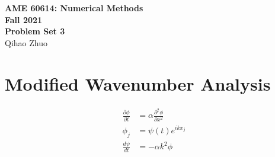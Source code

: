 \documentclass[letterpaper,10pt]{article}
\begin{document}
\fancyhf{}
\fancyfoot[C]{\thepage}

\thispagestyle{plain}
\begin{center}
  \large
  \textbf{AME 60614: Numerical Methods} \\
  \textbf{Fall 2021} \\
  \vspace{0.5em}
  \textbf{Problem Set 3} \\
  \vspace{1em}
  Qihao Zhuo
\end{center}

\vspace{1.5em}

\section{Modified Wavenumber Analysis}\label{sec1}
\begin{align*}
  \frac{\partial \phi}{\partial t}&=\alpha \frac{\partial^2 \phi}{\partial x^2}\\
  \phi_j &= \psi(t)e^{ikx_j}\\
  \frac{d\psi}{dt}&=-\alpha k^2 \phi
\end{align*}
\end{document}
